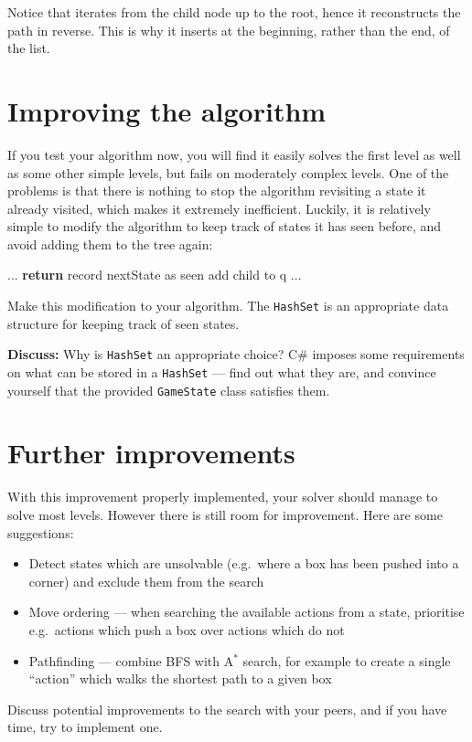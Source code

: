 \documentclass{../../../bsc-assignment-briefs/fal_assignment}
\begin{document}
Notice that  iterates from the child node up to the root, hence it reconstructs the path in reverse.
This is why it inserts at the beginning, rather than the end, of the list.

\section*{Improving the algorithm}

If you test your algorithm now, you will find it easily solves the first level
as well as some other simple levels, but fails on moderately complex levels.
One of the problems is that there is nothing to stop the algorithm revisiting a state it already visited,
which makes it extremely inefficient.
Luckily, it is relatively simple to modify the algorithm to keep track of states it has seen before, and avoid adding them to the tree again:

\begin{algorithmic}
        \State ...
            \State \textbf{return} 
            \State record nextState as seen
            \State add child to q
        \EndIf
        \State ...
    \EndProcedure
\end{algorithmic}

Make this modification to your algorithm.
The \lstinline{HashSet} is an appropriate data structure for keeping track
of seen states.

\textbf{Discuss:} Why is \lstinline{HashSet} an appropriate choice?
C\# imposes some requirements on what can be stored in a \lstinline{HashSet} ---
find out what they are, and convince yourself that the provided \lstinline{GameState} class satisfies them.

\section*{Further improvements}

With this improvement properly implemented, your solver should manage to solve most levels.
However there is still room for improvement.
Here are some suggestions:
\begin{itemize}
    \item Detect states which are unsolvable (e.g.\ where a box has been pushed into a corner) and exclude them from the search
    \item Move ordering --- when searching the available actions from a state, prioritise e.g.\ actions which push a box over actions which do not
    \item Pathfinding --- combine BFS with A$^*$ search, for example to create a single ``action'' which walks the shortest path to a given box
\end{itemize}
Discuss potential improvements to the search with your peers, and if you have time, try to implement one.
\end{document}
